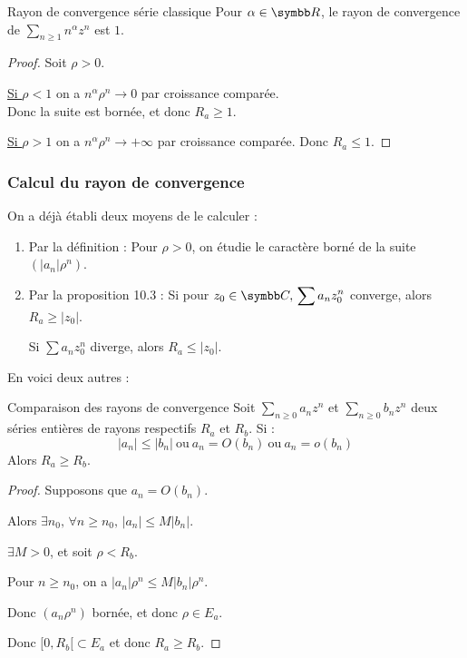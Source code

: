 \begin{propositionnt}{Rayon de convergence série classique}{}
    Pour $\alpha \in \R$, le rayon de convergence de $\sum_{n \geqslant 1} n^\alpha z^n$ est $1$.
\end{propositionnt}


\begin{proof}
    Soit $\rho > 0$. 

    \uline{Si $\rho < 1$} on a $n^\alpha \rho^n \to 0$ par croissance comparée. \\
    Donc la suite est bornée, et donc $R_a \geqslant 1$.

    \uline{Si $\rho > 1$} on a $n^\alpha \rho^n \to +\infty$ par croissance comparée.
    Donc $R_a \leqslant 1$.
\end{proof}

\subsubsection{Calcul du rayon de convergence}

On a déjà établi deux moyens de le calculer :
\begin{enumerate}
    \item Par la définition :
    Pour $\rho > 0$, on étudie le caractère borné de la suite $(|a_n| \rho^n)$.

    \item Par la proposition 10.3 :
    Si pour $z_0 \in \C, \, \displaystyle \sum a_n z_0^n$ converge, alors $R_a \geqslant |z_0|$.

    Si $\sum a_n z_0^n$ diverge, alors $R_a \leqslant |z_0|$.
\end{enumerate}

En voici deux autres :

\begin{proposition}{Comparaison des rayons de convergence}{}
    Soit $\sum_{n \geqslant 0} a_n z^n$ et $\sum_{n \geqslant 0} b_n z^n$ deux séries entières
    de rayons respectifs $R_a$ et $R_b$. Si :
    \[
        |a_n| \leqslant |b_n| ~ \text{ou} ~
        a_n = O(b_n) ~ \text{ou} ~
        a_n = o(b_n)
    \]
    Alors $R_a \geqslant R_b$.
\end{proposition}


\begin{proof}
    Supposons que $a_n = O(b_n)$. 

    Alors $\exists n_0, \, \forall n \geqslant n_0, \, |a_n| \leqslant M |b_n|$.

    $\exists M > 0$, et soit $\rho < R_b$. 

    Pour $n \geqslant n_0$, on a $|a_n| \rho^n \leqslant M |b_n| \rho^n$.

    Donc $(a_n \rho^n)$ bornée, et donc $\rho \in E_a$.

    Donc $[0, R_b[ \subset E_a$ et donc $R_a \geqslant R_b$.
\end{proof}

